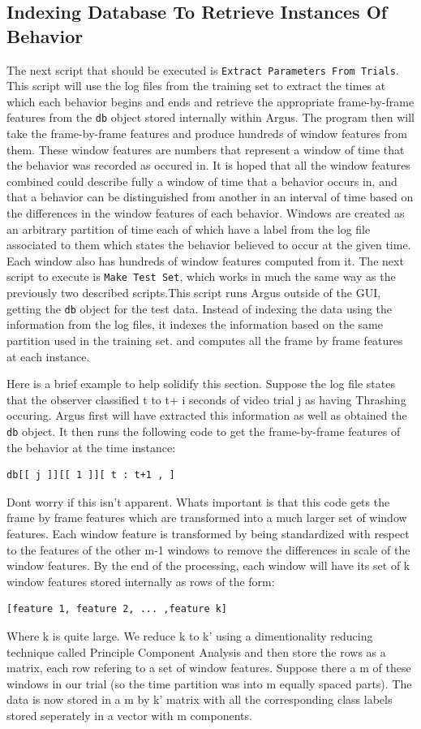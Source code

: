 \documentclass[12pt,titlepage]{report}
\begin{document}
\subsection{Indexing Database To Retrieve Instances Of Behavior}
The next script that should be executed is \texttt{Extract Parameters From Trials}. This script will use the log files from the training set to extract the times at which each behavior begins and ends and retrieve the appropriate frame-by-frame features from the \texttt{db} object stored internally within Argus. The program then will take the frame-by-frame features and produce hundreds of window features from them. These window features are numbers that represent a window of time that the behavior was recorded as occured in. It is hoped that all the window features combined could describe fully a window of time that a behavior occurs in, and that a behavior can be distinguished from another in an interval of time based on the differences in the window features of each behavior.
Windows are created as an arbitrary partition of time each of which have a label from the log file associated to them which states the behavior believed to occur at the given time. Each window also has hundreds of window features computed from it. The next script to execute is \texttt{Make Test Set}, which works in much the same way as the previously two described scripts.This script runs Argus outside of the GUI, getting the \texttt{db} object for the test data. Instead of indexing the data using the information from the log files, it indexes the information based on the same partition used in the training set. and computes all the frame by frame features at each instance.

Here is a brief example to help solidify this section. Suppose the log file states that the observer classified t to t+ i seconds of video trial j as having Thrashing occuring. Argus first will have extracted this information as well as obtained the \texttt{db} object.
It then runs the following code to get the frame-by-frame features of the behavior at the time instance:
\begin{verbatim}
db[[ j ]][[ 1 ]][ t : t+1 , ]
\end{verbatim}
Dont worry if this isn't apparent. Whats important is that this code gets the frame by frame features which are transformed into a much larger set of window features. Each window feature is transformed by being standardized with respect to the features of the other m-1 windows to remove the differences in scale of the window features. By the end of the processing, each window will have its set of k window features stored internally as rows of the form:
\begin{verbatim}
[feature 1, feature 2, ... ,feature k]
\end{verbatim}
Where k is quite large. We reduce k to k' using a dimentionality reducing technique called Principle Component Analysis and then store the rows as a matrix, each row refering to a set of window features. Suppose there a m of these windows in our trial (so the time partition was into m equally spaced parts). The data is now stored in a m by k' matrix with all the corresponding class labels stored seperately in a vector with m components.
\end{document}
